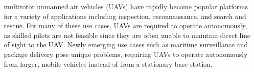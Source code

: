 
multirotor unmanned air vehicles (UAVs) have rapidly become popular platforms for
a variety of applications including
inspection, reconnaissance, and search and rescue.
For many of these use cases, UAVs are required to operate
autonomously, as skilled pilots are not feasible
since they are often unable to maintain direct line of sight to the UAV.
Newly emerging use cases such as maritime surveillance and package delivery
pose unique problems, requiring UAVs to operate autonomously from larger,
mobile vehicles instead of from a stationary base station.



